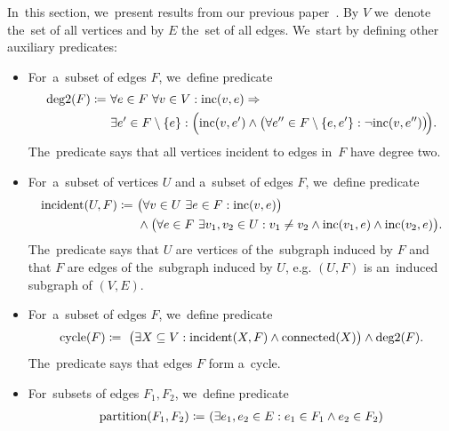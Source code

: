 In~this section, we~present results from our previous paper~\cite{my_paper}.
By \( V \) we~denote the~set of all vertices and
by \( E \) the~set of all edges.
We~start by defining other auxiliary predicates:
%
\begin{itemize}
	\item For~a~subset of edges \( F \), we~define predicate
	      \begin{align*}
		      \text{deg2}(F) \coloneqq \ 
					 & \forall e \in F \  \forall v \in V : \text{inc} (v, e) \Rightarrow                                                                      \\
		       & \exists e' \in F \setminus \{e\} : \Big( \text{inc} (v, e') \land \big(\forall e'' \in F \setminus \{e, e'\}: \lnot \text{inc} (v, e'')\big)\!\Big).
	      \end{align*}
	      The~predicate says that all vertices incident to edges in~\( F \) have degree two.
	\item For~a~subset of vertices \( U \) and a~subset of edges \( F \), we~define predicate
	      \begin{align*}
		      \text{incident}(U, F) \coloneqq \ 
		       & \big(\forall v \in U \  \exists e \in F : \text{inc} (v, e)\big)                                                       \\
		       & \land \big(\forall e \in F \  \exists v_1, v_2 \in U : v_1 \ne v_2 \land \text{inc} (v_1, e) \land \text{inc} (v_2, e)\big).
	      \end{align*}
	      The~predicate says that \( U \) are vertices of the~subgraph induced by \( F \)
	      and that \( F \) are edges of the~subgraph induced by \( U \),
	      e.g. \( (U, F) \) is an~induced subgraph of \( (V, E) \).
	\item For~a~subset of edges \( F \), we~define predicate
	      \begin{align*}
		      \text{cycle}(F) \coloneqq \ 
		      \big( \exists X \subseteq V : \text{incident}(X, F) \land \text{connected}(X) \big)
		      \land \text{deg2}(F).
	      \end{align*}
	      The~predicate says that edges \( F \) form a~cycle.
	\item For~subsets of edges \( F_1, F_2 \), we~define predicate
	      \begin{align*}
		      \text{partition}(F_1, F_2) \coloneqq \predsp
		       & (\exists e_1, e_2 \in E : e_1 \in F_1 \land e_2 \in F_2 )    \\

\end{align*}
\end{itemize}

